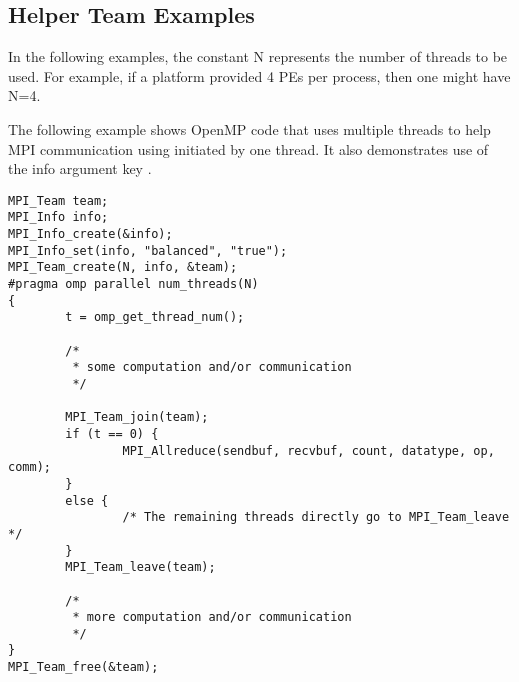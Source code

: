 \subsection{Helper Team Examples}

In the following examples, the constant N represents the number of threads
to be used. For example, if a platform provided 4 PEs per process, then
one might have N=4.

\begin{example}{\rm
{}%
%
%
%
%

The following example shows OpenMP code that uses multiple threads
to help MPI communication using  initiated by one thread.
It also demonstrates use of the info argument key .

\begin{verbatim}
MPI_Team team;
MPI_Info info;
MPI_Info_create(&info);
MPI_Info_set(info, "balanced", "true");
MPI_Team_create(N, info, &team);
#pragma omp parallel num_threads(N)
{
        t = omp_get_thread_num();

        /*
         * some computation and/or communication
         */

        MPI_Team_join(team);
        if (t == 0) {
                MPI_Allreduce(sendbuf, recvbuf, count, datatype, op, comm);
        }
        else {
                /* The remaining threads directly go to MPI_Team_leave */
        }
        MPI_Team_leave(team);

        /*
         * more computation and/or communication
         */
}
MPI_Team_free(&team);
\end{verbatim}

}
\end{example}

